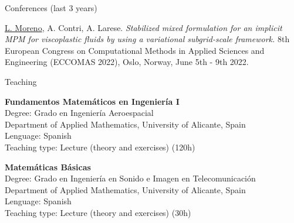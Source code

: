 \documentclass[letterpaper,english]{article}
\begin{document}
\begin{cv}{}
\begin{cvlist}{Conferences (last 3 years)}
    \item[\footnotesize{JUN 2022}] \underline{L. Moreno}, A. Contri, A. Larese. \textit{Stabilized mixed formulation for an implicit MPM for viscoplastic fluids by using a variational subgrid-scale framework.} 8th European Congress on Computational Methods in Applied Sciences and Engineering (ECCOMAS 2022), Oslo, Norway, June 5th - 9th 2022.
\end{cvlist}
\begin{cvlist}{Teaching}
   \item[\footnotesize{2024 - 2025}] \textbf{Fundamentos Matemáticos en Ingeniería I}\\
   Degree: Grado en Ingeniería Aeroespacial\\
   Department of Applied Mathematics, University of Alicante, Spain\\
   Lenguage: Spanish\\
   Teaching type: Lecture (theory and exercises) (120h)

    \item[\footnotesize{2024 - 2025}] \textbf{Matemáticas Básicas}\\
   Degree: Grado en Ingeniería en Sonido e Imagen en Telecomunicación\\
   Department of Applied Mathematics, University of Alicante, Spain\\
   Lenguage: Spanish\\
   Teaching type: Lecture (theory and exercises) (30h)
   

\end{cvlist}
\end{cv}
\end{document}
